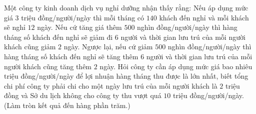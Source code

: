 \begin{ex}
Một công ty kinh doanh dịch vụ nghỉ dưỡng nhận thấy rằng: Nếu áp dụng mức giá $3$ triệu đồng/người/ngày thì mỗi tháng có $140$ khách đến nghỉ và mỗi khách sẽ nghỉ $12$ ngày. Nếu cứ tăng giá thêm $500$ nghìn đồng/người/ngày thì hàng tháng số khách đến nghỉ sẽ giảm đi $6$ người và thời gian lưu trú của mỗi người khách cũng giảm $2$ ngày. Ngược lại, nếu cứ giảm $500$ nghìn đồng/người/ngày thì hàng tháng số khách đến nghỉ sẽ tăng thêm $6$ người và thời gian lưu trú của mỗi người khách cũng tăng thêm $2$ ngày. Hỏi công ty cần áp dụng mức giá bao nhiêu triệu đồng/người/ngày để lợi nhuận hàng tháng thu được là lớn nhất, biết tổng chi phí công ty phải chi cho một ngày lưu trú của mỗi người khách là $2$ triệu đồng và Sở du lịch không cho công ty thu vượt quá $10$ triệu đồng/người/ngày. (Làm tròn kết quả đến hàng phần trăm.)
\end{ex}
